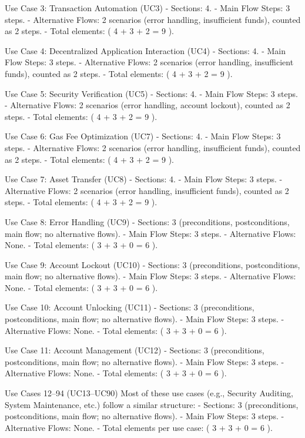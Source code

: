 Use Case 3: Transaction Automation (UC3)
- Sections: 4.
- Main Flow Steps: 3 steps.
- Alternative Flows: 2 scenarios (error handling, insufficient funds), counted as 2 steps.
- Total elements: ( 4 + 3 + 2 = 9 ).

Use Case 4: Decentralized Application Interaction (UC4)
- Sections: 4.
- Main Flow Steps: 3 steps.
- Alternative Flows: 2 scenarios (error handling, insufficient funds), counted as 2 steps.
- Total elements: ( 4 + 3 + 2 = 9 ).

Use Case 5: Security Verification (UC5)
- Sections: 4.
- Main Flow Steps: 3 steps.
- Alternative Flows: 2 scenarios (error handling, account lockout), counted as 2 steps.
- Total elements: ( 4 + 3 + 2 = 9 ).

Use Case 6: Gas Fee Optimization (UC7)
- Sections: 4.
- Main Flow Steps: 3 steps.
- Alternative Flows: 2 scenarios (error handling, insufficient funds), counted as 2 steps.
- Total elements: ( 4 + 3 + 2 = 9 ).

Use Case 7: Asset Transfer (UC8)
- Sections: 4.
- Main Flow Steps: 3 steps.
- Alternative Flows: 2 scenarios (error handling, insufficient funds), counted as 2 steps.
- Total elements: ( 4 + 3 + 2 = 9 ).

Use Case 8: Error Handling (UC9)
- Sections: 3 (preconditions, postconditions, main flow; no alternative flows).
- Main Flow Steps: 3 steps.
- Alternative Flows: None.
- Total elements: ( 3 + 3 + 0 = 6 ).

Use Case 9: Account Lockout (UC10)
- Sections: 3 (preconditions, postconditions, main flow; no alternative flows).
- Main Flow Steps: 3 steps.
- Alternative Flows: None.
- Total elements: ( 3 + 3 + 0 = 6 ).

Use Case 10: Account Unlocking (UC11)
- Sections: 3 (preconditions, postconditions, main flow; no alternative flows).
- Main Flow Steps: 3 steps.
- Alternative Flows: None.
- Total elements: ( 3 + 3 + 0 = 6 ).

Use Case 11: Account Management (UC12)
- Sections: 3 (preconditions, postconditions, main flow; no alternative flows).
- Main Flow Steps: 3 steps.
- Alternative Flows: None.
- Total elements: ( 3 + 3 + 0 = 6 ).

Use Cases 12–94 (UC13–UC90)
Most of these use cases (e.g., Security Auditing, System Maintenance, etc.) follow a similar structure:
- Sections: 3 (preconditions, postconditions, main flow; no alternative flows).
- Main Flow Steps: 3 steps.
- Alternative Flows: None.
- Total elements per use case: ( 3 + 3 + 0 = 6 ).


